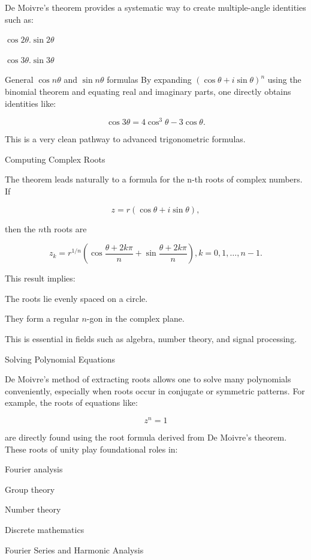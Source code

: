   De Moivre's theorem provides a systematic way to create multiple-angle identities such as:

  \startitemize[i]
\item $\cos2\theta.\sin2\theta$
\item $\cos3\theta.\sin3\theta$
\item General $\cos n\theta$ and $\sin n\theta$ formulas
  \stopitemize
  By expanding $(\cos⁡\theta+i\sin⁡\theta)^n$ using the binomial theorem and equating real and imaginary
  parts, one directly obtains identities like:

  $$\cos3\theta = 4\cos^3\theta - 3\cos\theta.$$

  This is a very clean pathway to advanced trigonometric formulas.
\item Computing Complex Roots

  The theorem leads naturally to a formula for the n-th roots of complex numbers. If

  $$z = r(\cos\theta + i\sin\theta),$$

  then the $n$th roots are

  $$z_k = r^{1/n}\left(\cos\frac{\theta + 2k\pi}{n} + \sin \frac{\theta + 2k\pi}{n}\right), k = 0, 1,
  \ldots, n - 1.$$

  This result implies:

  \startitemize[i]
\item The roots lie evenly spaced on a circle.
\item They form a regular $n$-gon in the complex plane.
  \stopitemize

  This is essential in fields such as algebra, number theory, and signal processing.
\item Solving Polynomial Equations

  De Moivre's method of extracting roots allows one to solve many polynomials conveniently, especially when
  roots occur in conjugate or symmetric patterns. For example, the roots of equations like:

  $$z^n = 1$$

  are directly found using the root formula derived from De Moivre’s theorem. These roots of unity play
  foundational roles in:

  \startitemize[i]
\item Fourier analysis
\item Group theory
\item Number theory
\item Discrete mathematics
  \stopitemize
\item Fourier Series and Harmonic Analysis

